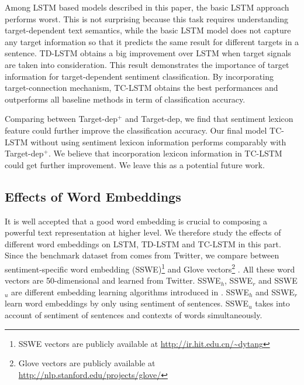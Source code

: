 \documentclass[11pt]{article}
\begin{document}
Among LSTM based models described in this paper, the basic LSTM approach performs worst. This is not surprising because this task requires understanding target-dependent text semantics,  while the basic LSTM model does not capture any target information so that it predicts the same result for different targets in a sentence. 
TD-LSTM obtains a big improvement over LSTM when target signals are taken into consideration. This result demonstrates the importance of target information for target-dependent sentiment classification. 
By incorporating target-connection mechanism, TC-LSTM obtains the best performances and outperforms all baseline methods in term of classification accuracy. 

Comparing between Target-dep$^+$ and Target-dep, we find that sentiment lexicon feature could further improve the classification accuracy. Our final model TC-LSTM without using sentiment lexicon information performs comparably with Target-dep$^+$. We believe that incorporation lexicon information in TC-LSTM could get further improvement. We leave this as a potential future work. 

\subsection{Effects of Word Embeddings}
It is well accepted that a good word embedding is crucial to composing a powerful text representation at higher level. 
We therefore study the effects of different word embeddings on LSTM, TD-LSTM and TC-LSTM in this part. 
Since the benchmark dataset from \cite{Dong2014a} comes from Twitter, we compare between sentiment-specific word embedding (SSWE)\footnote{SSWE vectors are publicly available at \url{http://ir.hit.edu.cn/~dytang}} \cite{Tang2014} and Glove vectors\footnote{Glove vectors are publicly available at \url{http://nlp.stanford.edu/projects/glove/}} \cite{Pennington2014}. All these word vectors are 50-dimensional and learned from Twitter. 
SSWE$_h$, SSWE$_r$ and SSWE$_u$ are different embedding learning algorithms introduced in \cite{Tang2014}. SSWE$_h$ and SSWE$_r$ learn word embeddings by only using sentiment of sentences. SSWE$_u$ takes into account of sentiment of sentences and contexts of words simultaneously.
\end{document}
